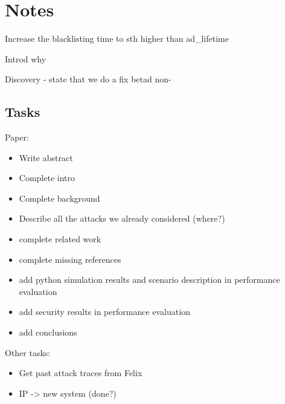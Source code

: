 
\section{Notes}
Increase the blacklisting time to sth higher than ad\_lifetime

Introd why


Discovery - state that we do a fix betad non-



\subsection{Tasks}
Paper: 

\begin{itemize}
	\item Write abstract
    \item Complete intro
    \item Complete background
    \item Describe all the attacks we already considered (where?)
    \item complete related work
    \item complete missing references
    \item add python simulation results and scenario description in performance evaluation
    \item add security results  in performance evaluation
    \item add conclusions
\end{itemize}

Other tasks:

\begin{itemize}
	\item Get past attack traces from Felix
    \item IP -> new system (done?)
\end{itemize}